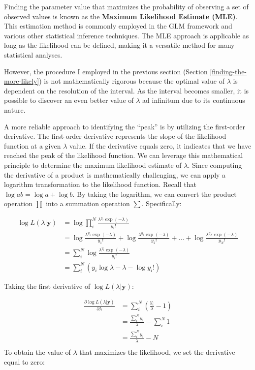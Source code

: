 \documentclass[
]{article}
\begin{document}
Finding the parameter value that maximizes the probability of observing a set of observed values is known as the \textbf{Maximum Likelihood Estimate (MLE)}. This estimation method is commonly employed in the GLM framework and various other statistical inference techniques. The MLE approach is applicable as long as the likelihood can be defined, making it a versatile method for many statistical analyses.

However, the procedure I employed in the previous section (Section \ref{finding-the-more-likely}) is not mathematically rigorous because the optimal value of \(\lambda\) is dependent on the resolution of the interval. As the interval becomes smaller, it is possible to discover an even better value of \(\lambda\) ad infinitum due to its continuous nature.

A more reliable approach to identifying the ``peak'' is by utilizing the first-order derivative. The first-order derivative represents the slope of the likelihood function at a given \(\lambda\) value. If the derivative equals zero, it indicates that we have reached the peak of the likelihood function. We can leverage this mathematical principle to determine the maximum likelihood estimate of \(\lambda\). Since computing the derivative of a product is mathematically challenging, we can apply a logarithm transformation to the likelihood function. Recall that \(\log ab = \log a + \log b\). By taking the logarithm, we can convert the product operation \(\prod\) into a summation operation \(\sum\). Specifically:

\[
\begin{aligned}
\log L(\lambda | \pmb{y}) &= \log \prod_i^N \frac{\lambda^{y_i} \exp(-\lambda)}{y_i!}\\
&= \log \frac{\lambda^{y_1} \exp(-\lambda)}{y_1!} + \log \frac{\lambda^{y_2} \exp(-\lambda)}{y_2!} + ... + \log \frac{\lambda^{y_N} \exp(-\lambda)}{y_N!}\\
&= \sum_i^N \log \frac{\lambda^{y_i} \exp(-\lambda)}{y_i!}\\
&= \sum_i^N (y_i \log \lambda -\lambda -\log y_i!)
\end{aligned}
\]

Taking the first derivative of \(\log L(\lambda | \pmb{y})\):

\[
\begin{aligned}
\frac{\partial\log L(\lambda|\pmb{y})}{\partial \lambda} &= \sum_i^N (\frac{y_i}{\lambda} -1)\\
&= \frac{\sum_i^N y_i}{\lambda} - \sum_i^N 1\\
&= \frac{\sum_i^N y_i}{\lambda} - N\\
\end{aligned}
\] To obtain the value of \(\lambda\) that maximizes the likelihood, we set the derivative equal to zero:
\end{document}
